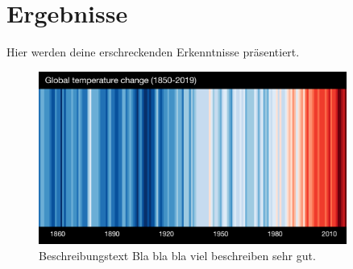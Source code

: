 \chapter{Ergebnisse}\label{ch:ergebnisse}
Hier werden deine erschreckenden Erkenntnisse präsentiert.

\begin{figure}[htbp]
	\centering
	\includegraphics[width=0.9\textwidth]{figures/stripes_GLOBE---1850-2019-MO-withlabels}
	\caption[Titel der Figure]{Beschreibungstext Bla bla bla viel beschreiben sehr gut. \cite{Hawkins.2019}}
	\label{fig:DieLableIhAuhhNoo}
\end{figure}